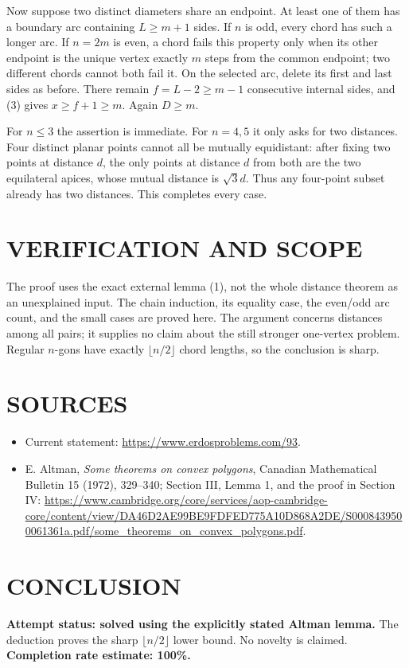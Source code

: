 Now suppose two distinct diameters share an endpoint. At least one of them has a boundary arc containing $L\geq m+1$ sides. If $n$ is odd, every chord has such a longer arc. If $n=2m$ is even, a chord fails this property only when its other endpoint is the unique vertex exactly $m$ steps from the common endpoint; two different chords cannot both fail it. On the selected arc, delete its first and last sides as before. There remain $f=L-2\geq m-1$ consecutive internal sides, and (3) gives $x\geq f+1\geq m$. Again $D\geq m$.

For $n\leq3$ the assertion is immediate. For $n=4,5$ it only asks for two distances. Four distinct planar points cannot all be mutually equidistant: after fixing two points at distance $d$, the only points at distance $d$ from both are the two equilateral apices, whose mutual distance is $\sqrt3d$. Thus any four-point subset already has two distances. This completes every case.

\section{VERIFICATION AND SCOPE}
The proof uses the exact external lemma (1), not the whole distance theorem as an unexplained input. The chain induction, its equality case, the even/odd arc count, and the small cases are proved here. The argument concerns distances among all pairs; it supplies no claim about the still stronger one-vertex problem. Regular $n$-gons have exactly $\lfloor n/2\rfloor$ chord lengths, so the conclusion is sharp.

\section{SOURCES}
\begin{itemize}
\item Current statement: \url{https://www.erdosproblems.com/93}.
\item E. Altman, \emph{Some theorems on convex polygons}, Canadian Mathematical Bulletin 15 (1972), 329--340; Section III, Lemma 1, and the proof in Section IV: \url{https://www.cambridge.org/core/services/aop-cambridge-core/content/view/DA46D2AE99BE9FDFED775A10D868A2DE/S0008439500061361a.pdf/some_theorems_on_convex_polygons.pdf}.
\end{itemize}

\section{CONCLUSION}
\textbf{Attempt status: solved using the explicitly stated Altman lemma.} The deduction proves the sharp $\lfloor n/2\rfloor$ lower bound. No novelty is claimed.
\textbf{Completion rate estimate: 100\%.}
